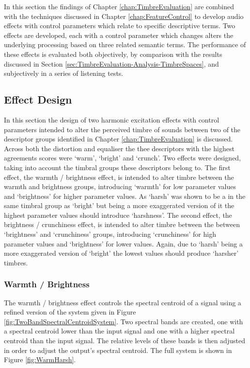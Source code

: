 	In this section the findings of Chapter \ref{chap:TimbreEvaluation} are combined with the techniques discussed in
	Chapter \ref{chap:FeatureControl} to develop audio effects with control parameters which relate to specific
	descriptive terms. Two effects are developed, each with a control parameter which changes alters the underlying
	processing based on three related semantic terms. The performance of these effects is evaluated both objectively,
	by comparison with the results discussed in Section \ref{sec:TimbreEvaluation-Analysis-TimbreSpaces}, and
	subjectively in a series of listening tests.

	\subsection{Effect Design}
	\label{sec:PerceptualExperiments-SemanticControl-EffectDesign}
		In this section the design of two harmonic excitation effects with control parameters intended to alter the
		perceived timbre of sounds between two of the descriptor groups identified in Chapter
		\ref{chap:TimbreEvaluation} is discussed. Across both the distortion and equaliser the thee descriptors
		with the highest agreements scores were `warm', `bright' and `crunch'. Two effects were designed, taking
		into account the timbral groups these descriptors belong to. The first effect, the warmth / brightness
		effect, is intended to alter timbre between the warmth and brightness groups, introducing `warmth' for low
		parameter values and `brightness' for higher parameter values. As `harsh' was shown to be a in the same
		timbral group as `bright' but being a more exaggerated version of it the highest parameter values should
		introduce `harshness'. The second effect, the brightness / crunchiness effect, is intended to alter timbre
		between the between `brightness' and `crunchiness' groups, introducing `crunchiness' for high parameter
		values and `brightness' for lower values. Again, due to `harsh' being a more exaggerated version of
		`bright' the lowest values should produce `harsher' timbres.

		\subsubsection*{Warmth / Brightness}
			The warmth / brightness effect controls the spectral centroid of a signal using a refined version
			of the system given in Figure \ref{fig:TwoBandSpectralCentroidSystem}. Two spectral bands are
			created, one with a spectral centroid lower than the input signal and one with a higher spectral
			centroid than the input signal. The relative levels of these bands is then adjusted in order to
			adjust the output's spectral centroid. The full system is shown in Figure \ref{fig:WarmHarsh}.

